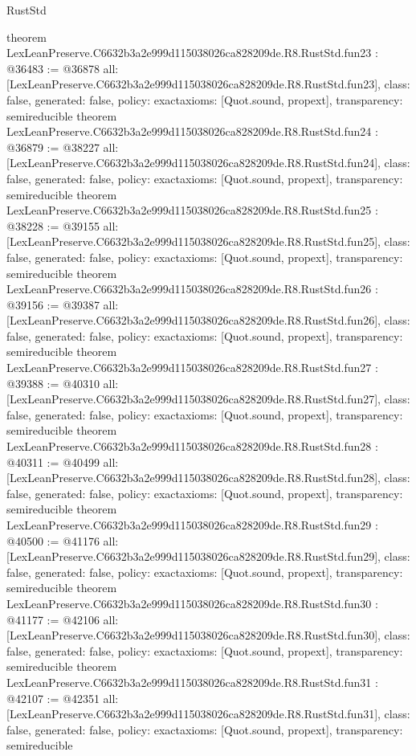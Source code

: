 \begin{lexlean}{RustStd}
\begin{coremodule}
{}
theorem LexLeanPreserve.C6632b3a2e999d115038026ca828209de.R8.RustStd.fun23 : @36483 := @36878 {
  all: [LexLeanPreserve.C6632b3a2e999d115038026ca828209de.R8.RustStd.fun23],
  class: false,
  generated: false,
  policy: exact{axioms: [Quot.sound, propext]},
  transparency: semireducible
}
theorem LexLeanPreserve.C6632b3a2e999d115038026ca828209de.R8.RustStd.fun24 : @36879 := @38227 {
  all: [LexLeanPreserve.C6632b3a2e999d115038026ca828209de.R8.RustStd.fun24],
  class: false,
  generated: false,
  policy: exact{axioms: [Quot.sound, propext]},
  transparency: semireducible
}
theorem LexLeanPreserve.C6632b3a2e999d115038026ca828209de.R8.RustStd.fun25 : @38228 := @39155 {
  all: [LexLeanPreserve.C6632b3a2e999d115038026ca828209de.R8.RustStd.fun25],
  class: false,
  generated: false,
  policy: exact{axioms: [Quot.sound, propext]},
  transparency: semireducible
}
theorem LexLeanPreserve.C6632b3a2e999d115038026ca828209de.R8.RustStd.fun26 : @39156 := @39387 {
  all: [LexLeanPreserve.C6632b3a2e999d115038026ca828209de.R8.RustStd.fun26],
  class: false,
  generated: false,
  policy: exact{axioms: [Quot.sound, propext]},
  transparency: semireducible
}
theorem LexLeanPreserve.C6632b3a2e999d115038026ca828209de.R8.RustStd.fun27 : @39388 := @40310 {
  all: [LexLeanPreserve.C6632b3a2e999d115038026ca828209de.R8.RustStd.fun27],
  class: false,
  generated: false,
  policy: exact{axioms: [Quot.sound, propext]},
  transparency: semireducible
}
theorem LexLeanPreserve.C6632b3a2e999d115038026ca828209de.R8.RustStd.fun28 : @40311 := @40499 {
  all: [LexLeanPreserve.C6632b3a2e999d115038026ca828209de.R8.RustStd.fun28],
  class: false,
  generated: false,
  policy: exact{axioms: [Quot.sound, propext]},
  transparency: semireducible
}
theorem LexLeanPreserve.C6632b3a2e999d115038026ca828209de.R8.RustStd.fun29 : @40500 := @41176 {
  all: [LexLeanPreserve.C6632b3a2e999d115038026ca828209de.R8.RustStd.fun29],
  class: false,
  generated: false,
  policy: exact{axioms: [Quot.sound, propext]},
  transparency: semireducible
}
theorem LexLeanPreserve.C6632b3a2e999d115038026ca828209de.R8.RustStd.fun30 : @41177 := @42106 {
  all: [LexLeanPreserve.C6632b3a2e999d115038026ca828209de.R8.RustStd.fun30],
  class: false,
  generated: false,
  policy: exact{axioms: [Quot.sound, propext]},
  transparency: semireducible
}
theorem LexLeanPreserve.C6632b3a2e999d115038026ca828209de.R8.RustStd.fun31 : @42107 := @42351 {
  all: [LexLeanPreserve.C6632b3a2e999d115038026ca828209de.R8.RustStd.fun31],
  class: false,
  generated: false,
  policy: exact{axioms: [Quot.sound, propext]},
  transparency: semireducible
}
\end{coremodule}
\end{lexlean}
